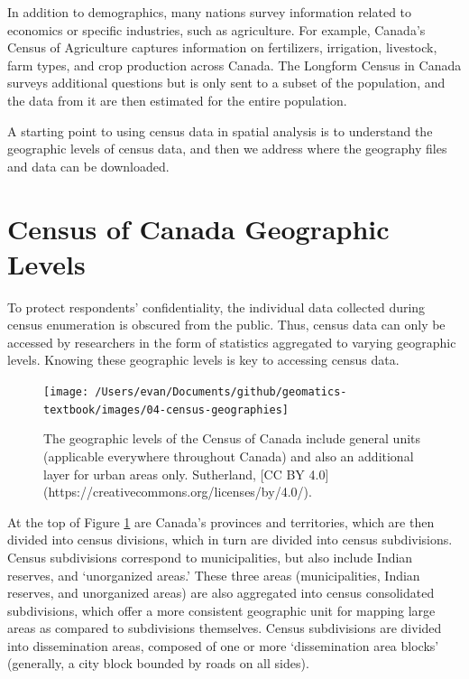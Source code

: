 \documentclass[
]{book}
\begin{document}
In addition to demographics, many nations survey information related to economics or specific industries, such as agriculture. For example, Canada's Census of Agriculture captures information on fertilizers, irrigation, livestock, farm types, and crop production across Canada. The Longform Census in Canada surveys additional questions but is only sent to a subset of the population, and the data from it are then estimated for the entire population.

A starting point to using census data in spatial analysis is to understand the geographic levels of census data, and then we address where the geography files and data can be downloaded.

\hypertarget{census-of-canada-geographic-levels}{%
\section{Census of Canada Geographic Levels}\label{census-of-canada-geographic-levels}}

To protect respondents' confidentiality, the individual data collected during census enumeration is obscured from the public. Thus, census data can only be accessed by researchers in the form of statistics aggregated to varying geographic levels. Knowing these geographic levels is key to accessing census data.

\begin{figure}
\texttt{[image: /Users/evan/Documents/github/geomatics-textbook/images/04-census-geographies]} \caption{The geographic levels of the Census of Canada include general units (applicable everywhere throughout Canada) and also an additional layer for urban areas only. Sutherland, [CC BY 4.0](https://creativecommons.org/licenses/by/4.0/).}\label{fig:04-census-geographies}
\end{figure}

At the top of Figure \ref{fig:04-census-geographies} are Canada's provinces and territories, which are then divided into census divisions, which in turn are divided into census subdivisions. Census subdivisions correspond to municipalities, but also include Indian reserves, and `unorganized areas.' These three areas (municipalities, Indian reserves, and unorganized areas) are also aggregated into census consolidated subdivisions, which offer a more consistent geographic unit for mapping large areas as compared to subdivisions themselves. Census subdivisions are divided into dissemination areas, composed of one or more `dissemination area blocks' (generally, a city block bounded by roads on all sides).
\end{document}
